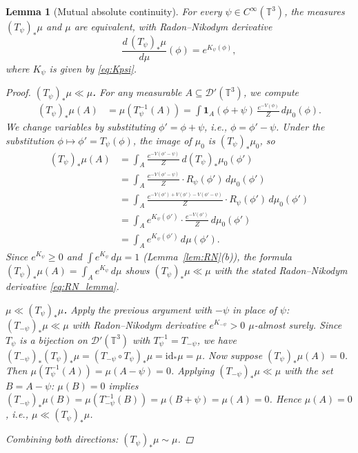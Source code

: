 \documentclass[11pt,a4paper]{article}
\newtheorem{lemma}[theorem]{Lemma}
\theoremstyle{definition}
\newcommand{\T}{\mathbb{T}}
\newcommand{\Dc}{\mathcal{D}}
\begin{document}
\begin{lemma}[Mutual absolute continuity]\label{lem:mac}
For every $\psi\in C^\infty(\T^3)$, the measures $(T_\psi)_*\mu$ and $\mu$ are equivalent, with Radon--Nikodym derivative
\begin{equation}\label{eq:RN_lemma}
\frac{d\,(T_\psi)_*\mu}{d\mu}(\phi) = e^{K_\psi(\phi)},
\end{equation}
where $K_\psi$ is given by \eqref{eq:Kpsi}.

\begin{proof}
\textbf{$(T_\psi)_*\mu \ll \mu$.}
For any measurable $A\subseteq\Dc'(\T^3)$, we compute
\begin{align}
(T_\psi)_*\mu(A)
&= \mu(T_\psi^{-1}(A))
= \int \mathbf{1}_A(\phi+\psi)\,\frac{e^{-V(\phi)}}{Z}\,d\mu_0(\phi).\label{eq:pushfwd_A}
\end{align}
We change variables by substituting $\phi' = \phi+\psi$, i.e., $\phi = \phi'-\psi$.
Under the substitution $\phi\mapsto\phi'=T_\psi(\phi)$, the image of $\mu_0$ is $(T_\psi)_*\mu_0$, so
\begin{align*}
(T_\psi)_*\mu(A)
&= \int_A \frac{e^{-V(\phi'-\psi)}}{Z}\,d(T_\psi)_*\mu_0(\phi')\\
&= \int_A \frac{e^{-V(\phi'-\psi)}}{Z}\cdot R_\psi(\phi')\,d\mu_0(\phi')\\
&= \int_A \frac{e^{-V(\phi')+V(\phi')-V(\phi'-\psi)}}{Z}\cdot R_\psi(\phi')\,d\mu_0(\phi')\\
&= \int_A e^{K_\psi(\phi')}\cdot\frac{e^{-V(\phi')}}{Z}\,d\mu_0(\phi')\\
&= \int_A e^{K_\psi(\phi')}\,d\mu(\phi').
\end{align*}
Since $e^{K_\psi}\ge 0$ and $\int e^{K_\psi}\,d\mu = 1$ (Lemma~\ref{lem:RN}(b)), the formula $(T_\psi)_*\mu(A) = \int_A e^{K_\psi}\,d\mu$ shows $(T_\psi)_*\mu\ll\mu$ with the stated Radon--Nikodym derivative \eqref{eq:RN_lemma}.

\medskip
\noindent\textbf{$\mu \ll (T_\psi)_*\mu$.}
Apply the previous argument with $-\psi$ in place of $\psi$: $(T_{-\psi})_*\mu\ll\mu$ with Radon--Nikodym derivative $e^{K_{-\psi}} > 0$ $\mu$-almost surely.
Since $T_\psi$ is a bijection on $\Dc'(\T^3)$ with $T_\psi^{-1} = T_{-\psi}$, we have $(T_{-\psi})_*(T_\psi)_*\mu = (T_{-\psi}\circ T_\psi)_*\mu = \mathrm{id}_*\mu = \mu$.
Now suppose $(T_\psi)_*\mu(A)=0$.  Then $\mu(T_\psi^{-1}(A)) = \mu(A-\psi) = 0$.
Applying $(T_{-\psi})_*\mu\ll\mu$ with the set $B=A-\psi$: $\mu(B)=0$ implies $(T_{-\psi})_*\mu(B) = \mu(T_{-\psi}^{-1}(B)) = \mu(B+\psi) = \mu(A) = 0$.
Hence $\mu(A) = 0$, i.e., $\mu\ll(T_\psi)_*\mu$.

\medskip
Combining both directions: $(T_\psi)_*\mu\sim\mu$.
\end{proof}
\end{lemma}
\end{document}
